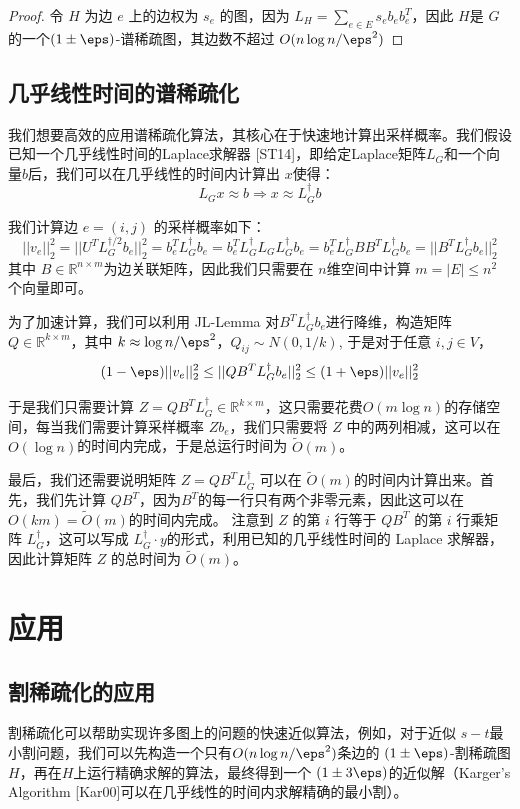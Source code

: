 \documentclass[lang=cn,newtx,10pt,scheme=chinese,chinesefont=nofont,citestyle=gb7714-2015, bibstyle=gb7714-2015]{elegantbook}
\begin{document}
\begin{refsection}
\begin{proof}
    令 $H$ 为边 $e$ 上的边权为 $s_e$ 的图，因为 $L_H=\sum_{e\in E}s_eb_eb_e^T$，因此 $H$是 $G$的一个$(1\pm\eps)$-谱稀疏图，其边数不超过 $O(n\log n /\eps^2)$
\end{proof}

\subsection{几乎线性时间的谱稀疏化}
我们想要高效的应用谱稀疏化算法，其核心在于快速地计算出采样概率。我们假设已知一个几乎线性时间的Laplace求解器 [ST14]，即给定Laplace矩阵$L_G$和一个向量$b$后，我们可以在几乎线性的时间内计算出 $x$使得：
\[
L_G x\approx b \Rightarrow x\approx L_G^\dagger b
\]

我们计算边 $e=(i,j)$ 的采样概率如下：
\[
||v_e||_2^2 = ||U^T L_G^{\dagger/2} b_e||_2^2 = b_e^T L_G^\dagger b_e =  b_e^T  L_G^\dagger L_G L_G^\dagger b_e = b_e^T  L_G^\dagger BB^T L_G^\dagger b_e = ||B^T L_G^{\dagger} b_e||_2^2
\]
其中 $B\in\mathbb{R}^{n\times m}$为边关联矩阵，因此我们只需要在 $n$维空间中计算 $m=|E|\leq n^2$ 个向量即可。

为了加速计算，我们可以利用 JL-Lemma 对$B^T L_G^{\dagger} b_e$进行降维，构造矩阵 $Q\in\mathbb{R}^{k\times m}$，其中 $k\approx \log n/\eps^2 $，$Q_{ij}\sim N(0,1/k)$, 于是对于任意 $i,j\in V$，
\[
(1-\eps)||v_e||_2^2 \leq ||QB^T L_G^{\dagger} b_e||_2^2\leq (1+\eps)||v_e||_2^2
\]

于是我们只需要计算 $Z = QB^T L_G^{\dagger} \in \mathbb{R}^{k\times m}$，这只需要花费$O(m\log n)$的存储空间，每当我们需要计算采样概率 $Zb_e$，我们只需要将 $Z$ 中的两列相减，这可以在 $O(\log n)$的时间内完成，于是总运行时间为 $\widetilde{O}(m)$。

最后，我们还需要说明矩阵 $Z = QB^T L_G^{\dagger}$ 可以在 $\widetilde{O}(m)$的时间内计算出来。首先，我们先计算 $QB^T$，因为$B^T$的每一行只有两个非零元素，因此这可以在 $O(km)=\widetilde{O}(m)$的时间内完成。
注意到 $Z$ 的第 $i$ 行等于 $QB^T$ 的第 $i$ 行乘矩阵 $L_G^{\dagger}$，这可以写成 $L_G^\dagger\cdot y$的形式，利用已知的几乎线性时间的 Laplace 求解器，因此计算矩阵 $Z$ 的总时间为 $\widetilde{O}(m)$。

\section{应用}
\subsection{割稀疏化的应用}
割稀疏化可以帮助实现许多图上的问题的快速近似算法，例如，对于近似 $s-t$最小割问题，我们可以先构造一个只有$O(n\log n/\eps^2)$条边的 $(1\pm\eps)$-割稀疏图$H$，再在$H$上运行精确求解的算法，最终得到一个 $(1\pm 3\eps)$的近似解（Karger's Algorithm [Kar00]可以在几乎线性的时间内求解精确的最小割）。


\end{refsection}
\end{document}
